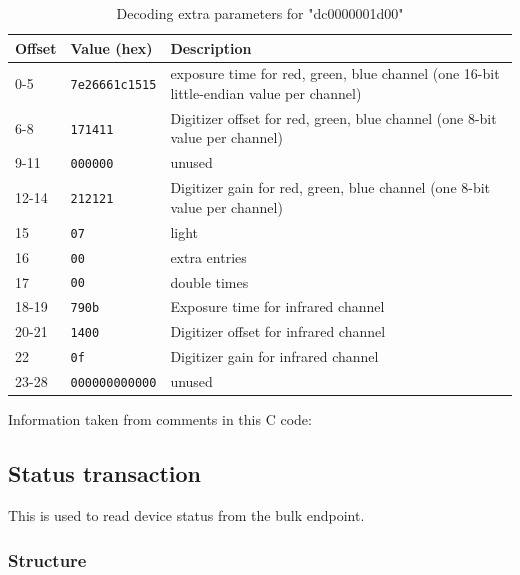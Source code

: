 \documentclass{article}
\begin{document}
\begin{table}[H]
  \caption{Decoding extra parameters for "dc0000001d00"}
  \centering
  \begin{tabular}{p{1cm} | p{2.5cm} | p{7cm}}
    Offset & Value (hex) & Description \\ \hline
    0-5 & {\tt 7e26661c1515} & exposure time for red, green, blue channel
                               (one 16-bit little-endian value per channel) \\
    6-8 & {\tt 171411} & Digitizer offset for red, green, blue channel
                               (one 8-bit value per channel) \\
    9-11 & {\tt 000000} & unused \\
    12-14 & {\tt 212121} & Digitizer gain for red, green, blue channel
                               (one 8-bit value per channel) \\
    15 & {\tt 07} & light \\
    16 & {\tt 00} & extra entries \\
    17 & {\tt 00} & double times \\
    18-19 & {\tt 790b} & Exposure time for infrared channel \\
    20-21 & {\tt 1400} & Digitizer offset for infrared channel \\
    22 & {\tt 0f} & Digitizer gain for infrared channel \\
    23-28 & {\tt 000000000000} & unused \\
  \end{tabular}
  
  \vspace{5mm}
  Information taken from comments in this C code: \cite[\texttt{pieusb\_scancmd.c}]{sane_code}
  \label{table:paramdc}
\end{table}

\subsection{Status transaction}
\label{ssec:read_trans}

This is used to read device status from the bulk endpoint.

\subsubsection{Structure}
\end{document}
